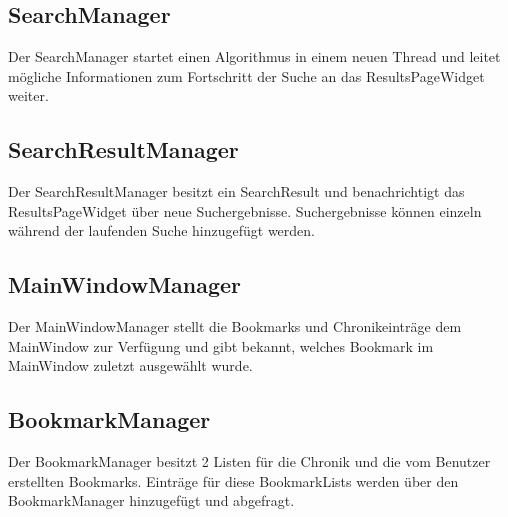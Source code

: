 \subsection*{SearchManager}
Der SearchManager startet einen Algorithmus in einem neuen Thread und leitet mögliche Informationen zum Fortschritt der Suche an das ResultsPageWidget weiter.

\subsection*{SearchResultManager}
Der SearchResultManager besitzt ein SearchResult und benachrichtigt das ResultsPageWidget über neue Suchergebnisse. Suchergebnisse können einzeln während der laufenden Suche hinzugefügt werden.

\subsection*{MainWindowManager}
Der MainWindowManager stellt die Bookmarks und Chronikeinträge dem MainWindow zur Verfügung und gibt bekannt, welches Bookmark im MainWindow zuletzt ausgewählt wurde.

\subsection*{BookmarkManager}
Der BookmarkManager besitzt 2 Listen für die Chronik und die vom Benutzer erstellten Bookmarks. Einträge für diese BookmarkLists werden über den BookmarkManager hinzugefügt und abgefragt.
